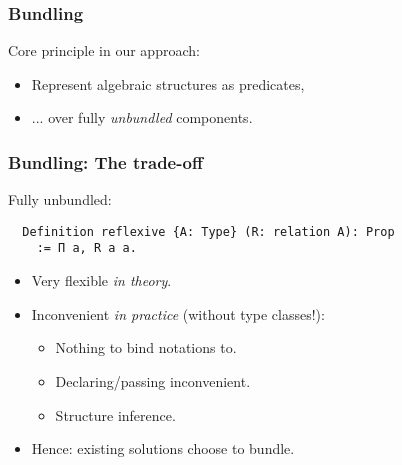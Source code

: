 \documentclass{beamer}
\begin{document}

\begin{frame}
\frametitle{Bundling}

Core principle in our approach: \\
\begin{itemize}
\item[] Represent algebraic structures as predicates,
\item[] ... over fully \emph{unbundled} components.
\end{itemize}
\end{frame}

\begin{frame}[fragile]
\frametitle{Bundling: The trade-off}

Fully unbundled:
\begin{lstlisting}
  Definition reflexive {A: Type} (R: relation A): Prop
    := Π a, R a a.
\end{lstlisting}

\begin{itemize}
\item Very flexible \emph{in theory}.
\item Inconvenient \emph{in practice} (without type classes!):
  \begin{itemize}
    \item Nothing to bind notations to. %
    \item Declaring/passing inconvenient. %
    \item Structure inference. %
  \end{itemize}
\item Hence: existing solutions choose to bundle. %
\end{itemize}
\end{frame}
\end{document}
